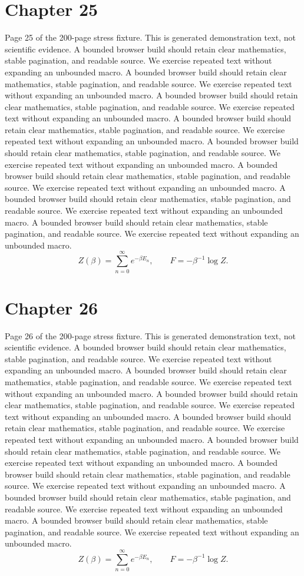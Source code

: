 \documentclass[11pt]{article}
\begin{document}
\section*{Chapter 25}
Page 25 of the 200-page stress fixture. This is generated demonstration text, not scientific evidence.
A bounded browser build should retain clear mathematics, stable pagination, and readable source. We exercise repeated text without expanding an unbounded macro.
A bounded browser build should retain clear mathematics, stable pagination, and readable source. We exercise repeated text without expanding an unbounded macro.
A bounded browser build should retain clear mathematics, stable pagination, and readable source. We exercise repeated text without expanding an unbounded macro.
A bounded browser build should retain clear mathematics, stable pagination, and readable source. We exercise repeated text without expanding an unbounded macro.
A bounded browser build should retain clear mathematics, stable pagination, and readable source. We exercise repeated text without expanding an unbounded macro.
A bounded browser build should retain clear mathematics, stable pagination, and readable source. We exercise repeated text without expanding an unbounded macro.
A bounded browser build should retain clear mathematics, stable pagination, and readable source. We exercise repeated text without expanding an unbounded macro.
A bounded browser build should retain clear mathematics, stable pagination, and readable source. We exercise repeated text without expanding an unbounded macro.
\[Z(\beta)=\sum_{n=0}^{\infty}e^{-\beta E_n},\qquad F=-\beta^{-1}\log Z.\]
\newpage
\section*{Chapter 26}
Page 26 of the 200-page stress fixture. This is generated demonstration text, not scientific evidence.
A bounded browser build should retain clear mathematics, stable pagination, and readable source. We exercise repeated text without expanding an unbounded macro.
A bounded browser build should retain clear mathematics, stable pagination, and readable source. We exercise repeated text without expanding an unbounded macro.
A bounded browser build should retain clear mathematics, stable pagination, and readable source. We exercise repeated text without expanding an unbounded macro.
A bounded browser build should retain clear mathematics, stable pagination, and readable source. We exercise repeated text without expanding an unbounded macro.
A bounded browser build should retain clear mathematics, stable pagination, and readable source. We exercise repeated text without expanding an unbounded macro.
A bounded browser build should retain clear mathematics, stable pagination, and readable source. We exercise repeated text without expanding an unbounded macro.
A bounded browser build should retain clear mathematics, stable pagination, and readable source. We exercise repeated text without expanding an unbounded macro.
A bounded browser build should retain clear mathematics, stable pagination, and readable source. We exercise repeated text without expanding an unbounded macro.
\[Z(\beta)=\sum_{n=0}^{\infty}e^{-\beta E_n},\qquad F=-\beta^{-1}\log Z.\]
\newpage
\end{document}
